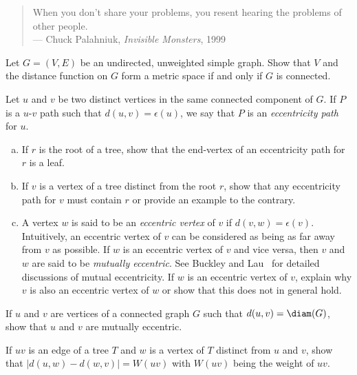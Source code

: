 \begin{quote}
\footnotesize
When you don't share your problems, you resent hearing the problems of
other people. \\
\noindent
--- Chuck Palahniuk, \emph{Invisible Monsters}, 1999
\end{quote}

\begin{problem}
\item Let $G = (V,E)$ be an undirected, unweighted simple graph. Show
  that $V$ and the distance function on $G$
  form a metric space if and only if $G$ is connected.

\item Let $u$ and $v$ be two distinct vertices in the same connected
  component of $G$. If $P$ is a $u$-$v$ path such that
  $d(u,v) = \epsilon(u)$, we say that $P$ is an
  \emph{eccentricity path} for $u$.
  \begin{enumerate}[(a)]
  \item If $r$ is the root of a tree, show that the end-vertex of an
    eccentricity path for $r$ is a leaf.

  \item If $v$ is a vertex of a tree distinct from the root $r$, show
    that any eccentricity path for $v$ must contain $r$ or provide an
    example to the contrary.

  \item A vertex $w$ is said to be an
    \emph{eccentric vertex} of $v$ if
    $d(v,w) = \epsilon(v)$. Intuitively, an eccentric vertex of $v$
    can be considered as being as far away from $v$ as possible. If
    $w$ is an eccentric vertex of $v$ and vice versa, then $v$ and $w$
    are said to be
    \emph{mutually eccentric}. See Buckley
    and Lau~\cite{BuckleyLau2003} for detailed discussions of mutual
    eccentricity. If $w$ is an eccentric vertex of $v$, explain why
    $v$ is also an eccentric vertex of $w$ or show that this does not
    in general hold.
  \end{enumerate}

\item If $u$ and $v$ are vertices of a connected graph $G$ such that
  $d(u,v) = \diam(G)$, show that $u$ and $v$ are mutually eccentric.

\item If $uv$ is an edge of a tree $T$ and $w$ is a vertex of $T$
  distinct from $u$ and $v$, show that $|d(u,w) - d(w,v)| = W(uv)$
  with $W(uv)$ being the weight of $uv$.


\end{problem}
